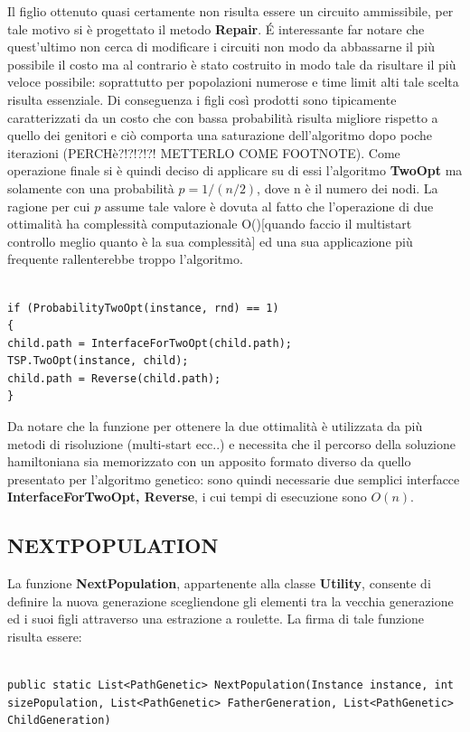 \documentclass[11pt]{article}
\begin{document}
Il figlio ottenuto quasi certamente non risulta essere un circuito ammissibile, per tale motivo si è progettato il metodo \textbf{Repair}. \'E interessante far notare che quest'ultimo non cerca di modificare i circuiti non modo da abbassarne il più possibile il costo ma al contrario è stato costruito in modo tale da risultare il più veloce possibile: soprattutto per popolazioni numerose e time limit alti tale scelta risulta essenziale. Di conseguenza i figli così prodotti sono tipicamente caratterizzati da un costo che con bassa probabilità risulta migliore rispetto a quello dei genitori e ciò comporta una saturazione dell'algoritmo dopo poche iterazioni (PERCHè?!?!?!?! METTERLO COME FOOTNOTE). Come operazione finale si è quindi deciso di applicare su di essi l'algoritmo \textbf{TwoOpt} ma solamente con una probabilità $p = 1 / (n/2)$, dove n è il numero dei nodi. La ragione per cui $p$ assume tale valore è dovuta al fatto che l'operazione di due ottimalità ha complessità computazionale O()[quando faccio il multistart controllo meglio quanto è la sua complessità] ed una sua applicazione più frequente rallenterebbe troppo l'algoritmo.

\begin{lstlisting}

if (ProbabilityTwoOpt(instance, rnd) == 1)
{
child.path = InterfaceForTwoOpt(child.path);
TSP.TwoOpt(instance, child);
child.path = Reverse(child.path);
}

\end{lstlisting}

Da notare che la funzione per ottenere la due ottimalità è utilizzata da più metodi di risoluzione (multi-start ecc..) e necessita che il percorso della soluzione hamiltoniana sia memorizzato con un apposito formato diverso da quello presentato per l'algoritmo genetico: sono quindi necessarie due semplici interfacce \textbf{InterfaceForTwoOpt, Reverse}, i cui tempi di esecuzione sono $O(n)$.

\subsection*{NEXTPOPULATION}

La funzione \textbf{NextPopulation}, appartenente alla classe \textbf{Utility}, consente di definire la nuova generazione scegliendone gli elementi tra la vecchia generazione ed i suoi figli attraverso una estrazione a roulette. La firma di tale funzione risulta essere:

\begin{lstlisting}

public static List<PathGenetic> NextPopulation(Instance instance, int sizePopulation, List<PathGenetic> FatherGeneration, List<PathGenetic> ChildGeneration)

\end{lstlisting}
\end{document}

